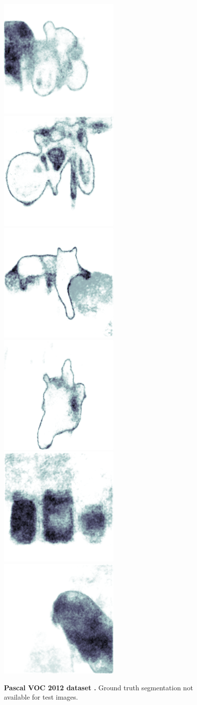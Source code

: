 \begin{figure}[p]
\begin{center}
{\includegraphics[height=0.125\linewidth]{BayesianSegNet/segnet_bayes_00202_uncertainty.png}
\includegraphics[height=0.125\linewidth]{BayesianSegNet/segnet_bayes_00147_uncertainty.png}
\includegraphics[height=0.125\linewidth]{BayesianSegNet/segnet_bayes_00148_uncertainty.png}
\includegraphics[height=0.125\linewidth]{BayesianSegNet/segnet_bayes_00166_uncertainty.png}
\includegraphics[height=0.125\linewidth]{BayesianSegNet/segnet_bayes_00017_uncertainty.png}
\includegraphics[height=0.125\linewidth]{BayesianSegNet/segnet_bayes_00023_uncertainty.png}
}
\end{center}
\caption[Bayesian SegNet results on the Pascal VOC dataset.]{\footnotesize \textbf{Pascal VOC 2012 dataset \citep{pascal}.} Ground truth segmentation not available for test images.}
\label{fig:qual_pascal}
\end{figure}

